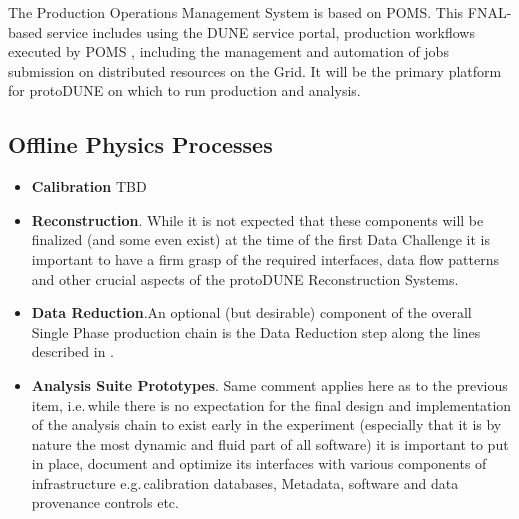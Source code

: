 \documentclass[pdftex,12pt,letter]{article}
\newcommand{\pd}{protoDUNE\xspace}
\newcommand{\singp}{Single Phase\xspace}
\begin{document}
The Production Operations Management System is based on POMS. This FNAL-based service includes using the DUNE service portal, production workflows executed by POMS \cite{poms}, including the management and automation of  jobs
submission on distributed resources on the Grid. It will be the primary platform for \pd on which to run production and analysis.

\subsection{Offline Physics Processes}
\begin{itemize}
\item \textbf{Calibration}  TBD
 \item \textbf{Reconstruction}. While it is not expected that these components will be finalized
(and some even exist) at the time of the first Data Challenge it is important to have a firm grasp of the required interfaces,
data flow patterns and other crucial aspects of the \pd Reconstruction Systems.
\item \textbf{Data Reduction}.An optional (but desirable)  component of the overall \singp production chain is the Data Reduction step along the lines described
in \cite{docdb2089}.
\item \textbf{Analysis Suite Prototypes}. Same comment applies here as to the previous item, i.e.\,while there is no expectation
for the final design and implementation of the analysis chain to exist early in the experiment (especially that it is by nature the most
dynamic and fluid part of all software) it is important to put in place, document and optimize its interfaces with various components
of infrastructure e.g.\,calibration databases, Metadata, software and data provenance controls etc.
\end{itemize}
\end{document}
